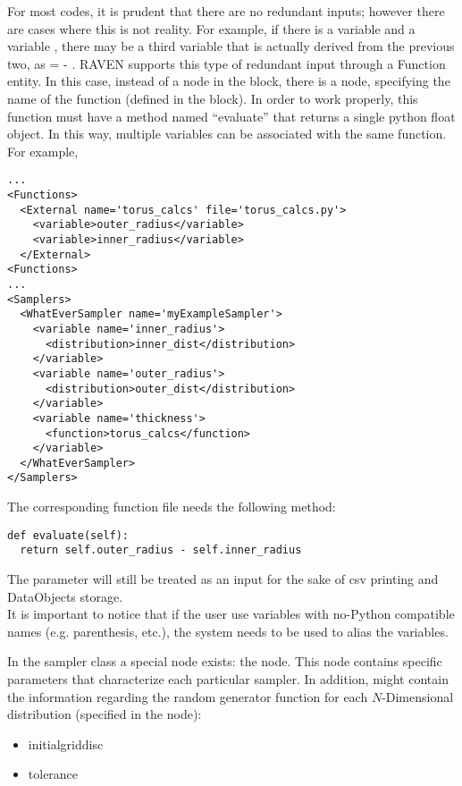 For most codes, it is prudent that there are no redundant inputs; however there are
cases where this is not reality.  For example, if there is a variable  and
a variable , there may be a third variable  that
is actually derived from the previous two, as  =  - .
RAVEN supports this type of redundant input through a Function entity.  In this case,
instead of a  node in the  block, there is a
 node, specifying the name of the function (defined in the  block).
In order to work properly, this function must have a method named ``evaluate''
that returns a single python float object. In this way, multiple variables can be associated with the same function.  For example,
\begin{lstlisting}[style=XML]
...
<Functions>
  <External name='torus_calcs' file='torus_calcs.py'>
    <variable>outer_radius</variable>
    <variable>inner_radius</variable>
  </External>
<Functions>
...
<Samplers>
  <WhatEverSampler name='myExampleSampler'>
    <variable name='inner_radius'>
      <distribution>inner_dist</distribution>
    </variable>
    <variable name='outer_radius'>
      <distribution>outer_dist</distribution>
    </variable>
    <variable name='thickness'>
      <function>torus_calcs</function>
    </variable>
  </WhatEverSampler>
</Samplers>
\end{lstlisting}
The corresponding function file  needs the following method:
\begin{lstlisting}
def evaluate(self):
  return self.outer_radius - self.inner_radius
\end{lstlisting}
The  parameter will still be treated as an input for the sake of csv
printing and DataObjects storage.
\\\nb It is important to notice that if the user use variables with no-Python compatible names (e.g. parenthesis, etc.),
the  system needs to be used to alias the variables.

In the sampler class a special node exists: the  node.
This node contains specific parameters that characterize each particular sampler.
In addition,  might contain the information regarding the random generator function for each $N$-Dimensional distribution (specified in the  node):
\begin{itemize}
\item initial\textunderscore grid\textunderscore disc
\item tolerance
\end{itemize}


